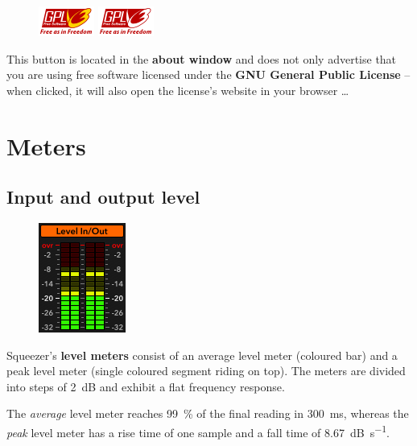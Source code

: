 \begin{figure}
  \includegraphics[scale=\screenshotscale,clip]{include/images/button_gpl_on.png}
  \newline \vspace{-0.9\baselineskip}
  \includegraphics[scale=\screenshotscale,clip]{include/images/button_gpl_off.png}
\end{figure}

This button is located in the \textbf{about window} and does not only
advertise that you are using free software licensed under the
\textbf{GNU General Public License} -- when clicked, it will also open
the license's website in your browser \dots

\chapter{Meters}
\label{chap:meters}

\section{Input and output level}

\begin{figure}
\includegraphics[scale=0.58,clip]{include/images/meter_levels.png}
\end{figure}

Squeezer's \textbf{level meters} consist of an average level meter
(coloured bar) and a peak level meter (single coloured segment riding
on top).  The meters are divided into steps of \SI{2}{\dB} and exhibit
a flat frequency response.

The \emph{average} level meter reaches \SI{99}{\percent} of the final
reading in \SI{300}{\milli\second}, whereas the \emph{peak} level
meter has a rise time of one sample and a fall time of
\SI{8.67}{\dB\per\second}.

